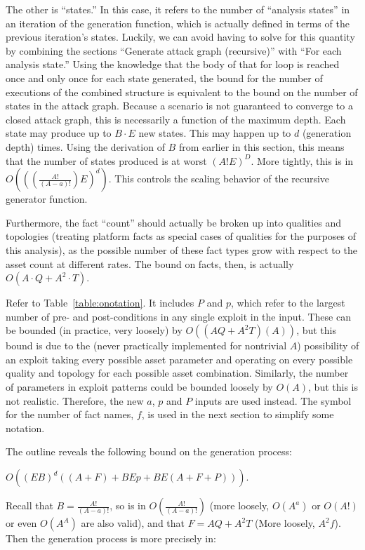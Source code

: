 The other is ``states.'' In this case, it refers to the number of ``analysis states''
in an iteration of the generation function, which is actually defined in terms
of the previous iteration's states. Luckily, we can avoid having to solve for
this quantity by combining the sections ``Generate attack graph (recursive)''
with ``For each analysis state.'' Using the knowledge that the body of that for
loop is reached once and only once for each state generated, the bound for the
number of executions of the combined structure is equivalent to the bound on
the number of states in the attack graph. Because a scenario is not guaranteed
to converge to a closed attack graph, this is necessarily a function of the
maximum depth. Each state may produce up to $B \cdot
E$ new states. This may happen up to $d$ (generation depth) times. Using the
derivation of $B$ from earlier in this section, this means 
that the number of states produced is at worst $(A!E)^{D}$.
More tightly, this is in 
$O\left(\left(\left(\frac{A!}{(A-a)!}\right)E\right)^{d}\right)$.
This controls the scaling behavior of the recursive generator function.

Furthermore, the fact ``count'' should actually be broken up into qualities and
topologies (treating platform facts as special cases of qualities for the
purposes of this analysis), as the possible number of these fact types grow 
with respect to the asset count at different rates. The bound on facts, then,
is actually $O(A \cdot Q + A^2 \cdot T)$.

Refer to Table~\ref{table:onotation}. It
includes $P$ and $p$, which refer to the largest number of pre- and 
post-conditions in any single exploit in the input. These can be bounded (in
practice, very loosely) by $O((AQ + A^2T)(A))$, but this bound is due to the
(never practically implemented for nontrivial $A$) possibility of an exploit
taking every possible asset parameter and operating on every possible quality
and topology for each possible asset combination. Similarly, the number of
parameters in exploit patterns could be bounded loosely by $O(A)$, but this is
not realistic. Therefore, the new $a$, $p$ and $P$ inputs are used instead.
The symbol for the number of fact names, $f$, is used in the next
section to simplify some notation.



The outline
reveals the following bound on the generation process:

$O((EB)^d((A+F) + BEp + BE(A+F+P)))$.

Recall that $B = \frac{A!}{(A-a)!}$, so is in $O(\frac{A!}{(A-a)!})$ 
(more loosely, $O(A^a)$ or $O(A!)$ or
even $O(A^A)$ are also valid), and that $F = AQ + A^2T$ (More loosely, $A^2f$). 
Then the generation process is more precisely in:

